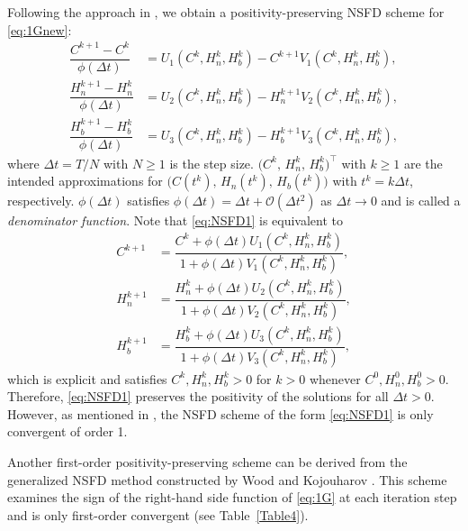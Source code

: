 \documentclass[11pt]{article}
\theoremstyle{definition}
\theoremstyle{remark}
\numberwithin{equation}{section}
\begin{document}
Following the approach in \cite{Cresson, Dimitrov3, Wood0}, we obtain a positivity-preserving NSFD scheme for \eqref{eq:1Gnew}: %
\begin{equation}\label{eq:NSFD1}
\begin{split}
\dfrac{C^{k + 1} - C^k}{\phi(\Delta t)} &= U_1(C^k, H_n^k, H_b^k) - C^{k+1}V_1(C^k, H_n^k, H_b^k),\\
\dfrac{H_n^{k + 1} - H_n^k}{\phi(\Delta t)} &= U_2(C^k, H_n^k, H_b^k) - H_n^{k+1}V_2(C^k, H_n^k, H_b^k),\\
\dfrac{H_b^{k + 1} - H_b^k}{\phi(\Delta t)} &= U_3(C^k, H_n^k, H_b^k) - H_b^{k+1}V_3(C^k, H_n^k, H_b^k),
\end{split}
\end{equation}
where $\Delta t=T/N$ with $N \ge 1$ is the step size.
$\big(C^k,\,H_n^k,\,H_b^k\big)^\top$ with $k \ge 1$ are the intended approximations for $\big(C(t^k),\,H_n(t^k),\,H_b(t^k)\big)$ with $t^k = k\Delta t$, respectively.
$\phi(\Delta t)$ satisfies $\phi(\Delta t) = \Delta t + \mathcal{O}(\Delta t^2)$ as $\Delta t\to0$ and  is called a \textit{denominator function}.
%
Note that \eqref{eq:NSFD1} is equivalent to
\begin{equation*}
\begin{split}
C^{k + 1} &=  \dfrac{C^k + \phi(\Delta t)U_1(C^k, H_n^k, H_b^k)}{1 + \phi(\Delta t)V_1(C^k, H_n^k, H_b^k)},\\
H_n^{k + 1} &=  \dfrac{H_n^k + \phi(\Delta t)U_2(C^k, H_n^k, H_b^k)}{1 + \phi(\Delta t)V_2(C^k, H_n^k, H_b^k)},\\
H_b^{k + 1} &=  \dfrac{H_b^k + \phi(\Delta t)U_3(C^k, H_n^k, H_b^k)}{1 + \phi(\Delta t)V_3(C^k, H_n^k, H_b^k)},
\end{split}
\end{equation*}
which is explicit and satisfies $C^{k}, H_n^k, H_b^k > 0$ for $k>0$ whenever $C^0, H_n^0, H_b^0 > 0$. Therefore, \eqref{eq:NSFD1} preserves the positivity of the solutions for all $\Delta t>0$.
However, as mentioned in \cite{Cresson}, the NSFD scheme of the form \eqref{eq:NSFD1} is only convergent of order 1. 

Another first-order positivity-preserving scheme can be derived from the generalized NSFD method constructed by Wood and Kojouharov \cite{Wood1}. 
This scheme examines the sign of the right-hand side function of \eqref{eq:1G} at each iteration step and is only first-order convergent (see Table~\ref{Table4}).
\end{document}
